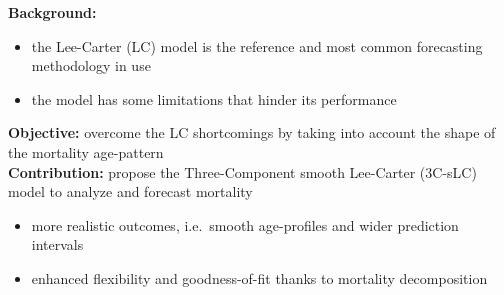 \documentclass[12pt, xcolor=table]{beamer}  %
\begin{document}
\begin{frame} %
	\textbf{Background:}
	\begin{itemize}
		\setlength\itemsep{0.5em}
		\item the Lee-Carter (LC) model is the reference and most common forecasting methodology in use 
		\item the model has some limitations that hinder its performance 
	\end{itemize}
	\bigskip \pause
	\textbf{Objective:} overcome the LC shortcomings by taking into account the shape of the mortality age-pattern
	\\ \bigskip \pause
	\textbf{Contribution:} propose the Three-Component smooth Lee-Carter (3C-sLC) model to analyze and forecast mortality
	\begin{itemize}
		\setlength\itemsep{0.5em}
		\item more realistic outcomes, i.e.~smooth age-profiles and wider prediction intervals 
		\item enhanced flexibility and goodness-of-fit thanks to mortality decomposition
	\end{itemize}
	
\end{frame}

%	
%	
\end{document}

